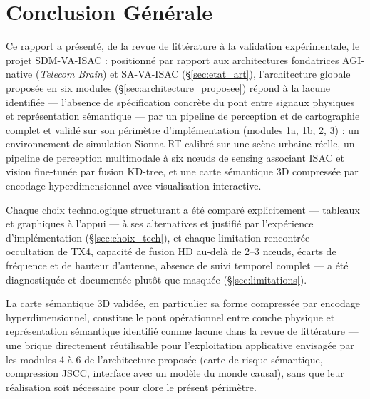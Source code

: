 \documentclass[12pt,a4paper,titlepage]{article}
\begin{document}
\section{Conclusion Générale}
\label{sec:conclusion}

Ce rapport a présenté, de la revue de littérature à la validation expérimentale, le projet SDM-VA-ISAC : positionné par rapport aux architectures fondatrices AGI-native (\textit{Telecom Brain}) et SA-VA-ISAC (\S\ref{sec:etat_art}), l'architecture globale proposée en six modules (\S\ref{sec:architecture_proposee}) répond à la lacune identifiée --- l'absence de spécification concrète du pont entre signaux physiques et représentation sémantique --- par un pipeline de perception et de cartographie complet et validé sur son périmètre d'implémentation (modules 1a, 1b, 2, 3) : un environnement de simulation Sionna RT calibré sur une scène urbaine réelle, un pipeline de perception multimodale à six n\oe uds de sensing associant ISAC et vision fine-tunée par fusion KD-tree, et une carte sémantique 3D compressée par encodage hyperdimensionnel avec visualisation interactive.

Chaque choix technologique structurant a été comparé explicitement --- tableaux et graphiques à l'appui --- à ses alternatives et justifié par l'expérience d'implémentation (\S\ref{sec:choix_tech}), et chaque limitation rencontrée --- occultation de TX4, capacité de fusion HD au-delà de 2--3 n\oe uds, écarts de fréquence et de hauteur d'antenne, absence de suivi temporel complet --- a été diagnostiquée et documentée plutôt que masquée (\S\ref{sec:limitations}).

La carte sémantique 3D validée, en particulier sa forme compressée par encodage hyperdimensionnel, constitue le pont opérationnel entre couche physique et représentation sémantique identifié comme lacune dans la revue de littérature --- une brique directement réutilisable pour l'exploitation applicative envisagée par les modules 4 à 6 de l'architecture proposée (carte de risque sémantique, compression JSCC, interface avec un modèle du monde causal), sans que leur réalisation soit nécessaire pour clore le présent périmètre.
\end{document}
